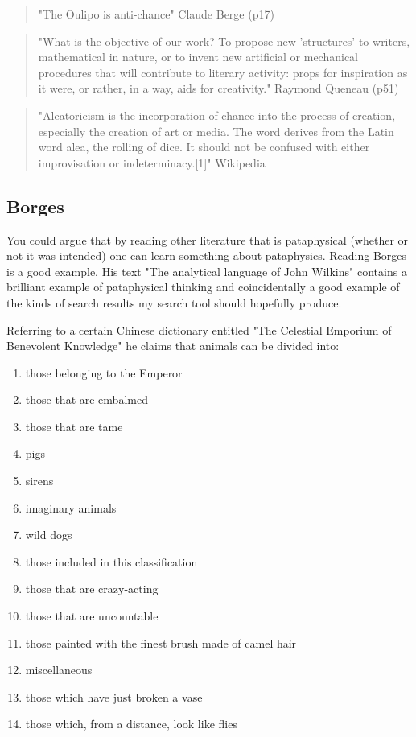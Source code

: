 \begin{quote}
  "The Oulipo is anti-chance" Claude Berge (p17)
\end{quote}

\begin{quote}
  "What is the objective of our work? To propose new 'structures' to writers, mathematical in nature, or to invent new artificial or mechanical procedures that will contribute to literary activity: props for inspiration as it were, or rather, in a way, aids for creativity." Raymond Queneau (p51)
\end{quote}

\begin{quote}
  "Aleatoricism is the incorporation of chance into the process of creation, especially the creation of art or media. The word derives from the Latin word alea, the rolling of dice. It should not be confused with either improvisation or indeterminacy.[1]" Wikipedia
\end{quote}

\subsection{Borges}

You could argue that by reading other literature that is pataphysical (whether or not it was intended) one can learn something about pataphysics. Reading Borges \citep{Borges1964, Borges2004, Borges1957, Borges2010a, Borges2010b, Borges2000} is a good example. His text "The analytical language of John Wilkins" \citep{Borges2000} contains a brilliant example of pataphysical thinking and coincidentally a good example of the kinds of search results my search tool should hopefully produce.

Referring to a certain Chinese dictionary entitled "The Celestial Emporium of Benevolent Knowledge" he claims that animals can be divided into:

\begin{enumerate}
  \item	those belonging to the Emperor
  \item	those that are embalmed
  \item	those that are tame
  \item	pigs
  \item	sirens
  \item	imaginary animals
  \item	wild dogs
  \item	those included in this classification
  \item	those that are crazy-acting
  \item	those that are uncountable
  \item	those painted with the finest brush made of camel hair
  \item	miscellaneous
  \item	those which have just broken a vase
  \item	those which, from a distance, look like flies
\end{enumerate}

